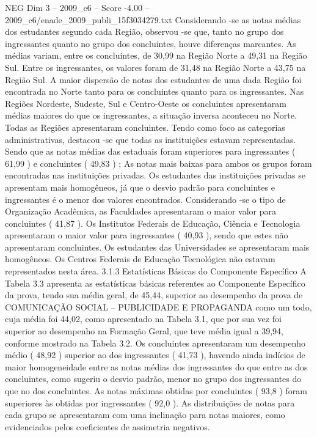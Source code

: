 \begin{textsample}{NEG Dim 3 – 2009\_c6 – Score -4.00 – 2009\_c6/enade\_2009\_publi\_15f3034279.txt}
Considerando -se as notas médias dos estudantes segundo cada Região, observou -se que, tanto no grupo dos ingressantes quanto no grupo dos concluintes, houve diferenças marcantes.
As médias variam, entre os concluintes, de 30,99 na Região Norte a 49,31 na Região Sul.
Entre os ingressantes, os valores foram de 31,48 na Região Norte a 43,75 na Região Sul.
A maior dispersão de notas dos estudantes de uma dada Região foi encontrada no Norte tanto para os concluintes quanto para os ingressantes.
Nas Regiões Nordeste, Sudeste, Sul e Centro-Oeste os concluintes apresentaram médias maiores do que os ingressantes, a situação inversa aconteceu no Norte.
Todas as Regiões apresentaram concluintes.
Tendo como foco as categorias administrativas, destacou -se que todas as instituições estavam representadas.
Sendo que as notas médias das estaduais foram superiores para ingressantes ( 61,99 ) e concluintes ( 49,83 ) ; As notas mais baixas para ambos os grupos foram encontradas nas instituições privadas.
Os estudantes das instituições privadas se apresentam mais homogêneos, já que o desvio padrão para concluintes e ingressantes é o menor dos valores encontrados.
Considerando -se o tipo de Organização Acadêmica, as Faculdades apresentaram o maior valor para concluintes ( 41,87 ).
Os Institutos Federais de Educação, Ciência e Tecnologia apresentaram o maior valor para ingressantes ( 40,93 ), sendo que estes não apresentaram concluintes.
Os estudantes das Universidades se apresentaram mais homogêneos.
Os Centros Federais de Educação Tecnológica não estavam representados nesta área. 3.1.3 Estatísticas Básicas do Componente Específico A Tabela 3.3 apresenta as estatísticas básicas referentes ao Componente Específico da prova, tendo sua média geral, de 45,44, superior ao desempenho da prova de COMUNICAÇÃO SOCIAL – PUBLICIDADE E PROPAGANDA como um todo, cuja média foi 44,02, como apresentado na Tabela 3.1, que por sua vez foi superior ao desempenho na Formação Geral, que teve média igual a 39,94, conforme mostrado na Tabela 3.2.
Os concluintes apresentaram um desempenho médio ( 48,92 ) superior ao dos ingressantes ( 41,73 ), havendo ainda indícios de maior homogeneidade entre as notas médias dos ingressantes do que entre as dos concluintes, como sugeriu o desvio padrão, menor no grupo dos ingressantes do que no dos concluintes.
As notas máximas obtidas por concluintes ( 93,8 ) foram superiores às obtidas por ingressantes ( 92,0 ).
As distribuições de notas para cada grupo se apresentaram com uma inclinação para notas maiores, como evidenciados pelos coeficientes de assimetria negativos.

\end{textsample}
